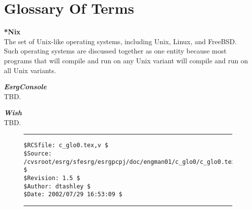 %
\chapter*{Glossary Of Terms}
\label{cglo0}

\begin{glossaryenum}
\item \textbf{*Nix} \\
      The set of Unix-like operating systems, including
      Unix, Linux,  and FreeBSD.
      Such operating systems are discussed together as one entity
      because most programs that will compile and run on any Unix variant
      will compile and run on all Unix variants.
\item \textbf{\emph{EsrgConsole}} \\
      TBD.
\item \textbf{\emph{Wish}} \\
      TBD.
\end{glossaryenum}

\noindent\begin{figure}[!b]
\noindent\rule[-0.25in]{\textwidth}{1pt}
\begin{tiny}
\begin{verbatim}
$RCSfile: c_glo0.tex,v $
$Source: /cvsroot/esrg/sfesrg/esrgpcpj/doc/engman01/c_glo0/c_glo0.tex,v $
$Revision: 1.5 $
$Author: dtashley $
$Date: 2002/07/29 16:53:09 $
\end{verbatim}
\end{tiny}
\noindent\rule[0.25in]{\textwidth}{1pt}
\end{figure}
%
%
%
%
%

